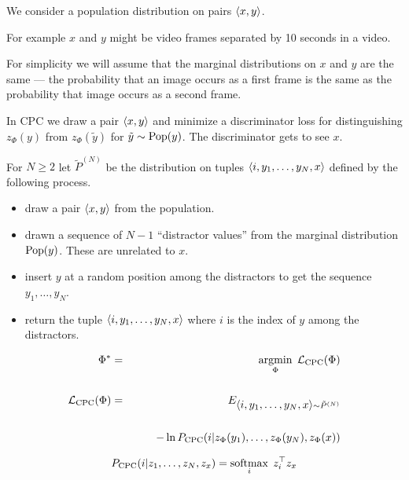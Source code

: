 {

We consider a population distribution on pairs ${\mbox{$\langle x,y\rangle$}}$.

\vfill
For example $x$ and $y$ might be video frames separated by 10 seconds in a video.

\vfill
For simplicity we will assume that the marginal distributions on $x$ and $y$ are the same --- the probability that an image occurs as a first frame
is the same as the probability that image occurs as a second frame.

\vfill
In CPC we draw a pair ${\mbox{$\langle x,y\rangle$}}$ and {\color{red} minimize} a discriminator loss for distinguishing $z_\Phi(y)$ from $z_\Phi(\tilde{y})$ for $\tilde{y} \sim \mathrm{Pop}(y)$.
The discriminator gets to see $x$.


For $N \geq 2$ let  $\tilde{P}^{(N)}$ be the distribution on tuples ${\mbox{$\langle i,y_1,\ldots,y_N,x\rangle$}}$
defined by the following process.

\begin{itemize}
\item draw a pair ${\mbox{$\langle x,y\rangle$}}$ from the population.

\item drawn a sequence of $N-1$ ``distractor values'' from the marginal distribution $\mathrm{Pop}(y)$.  These are unrelated to $x$.

\item insert $y$ at a random position among the distractors to get the sequence
$y_1,\ldots,y_N$.

\item return the tuple ${\mbox{$\langle i,y_1,\ldots,y_N,x\rangle$}}$ where $i$ is the index of $y$ among the distractors.
\end{itemize}


\begin{eqnarray*}
\Phi^*  & = & \operatorname*{argmin}_\Phi\;{\cal L}_\mathrm{CPC}(\Phi) \\
\\
{\cal L}_\mathrm{CPC}(\Phi) &= & E_{{\mbox{$\langle i,y_1,\ldots,y_N,x\rangle$}} \sim \tilde{P}^{(N)}} \\
\\
& & ~\;\;\;\;\;\; -\ln P_\mathrm{CPC}(i|z_\Phi(y_1),\ldots,z_\Phi(y_N),z_\Phi(x))
\end{eqnarray*}

\vfill
$$P_\mathrm{CPC}(i|z_1,\ldots,z_N,z_x) = \operatorname*{softmax}_i\;z_i^\top z_x$$

}
